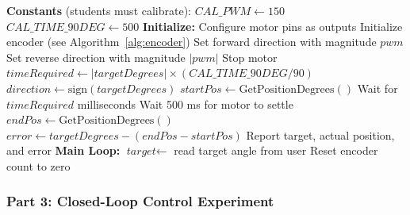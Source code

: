 \begin{algorithm}
\caption{Open-Loop Position Control (Timed Pulses)}
\label{alg:openloop}
\begin{algorithmic}[1]
\State \textbf{Constants} (students must calibrate):
\State \hspace{1em} $\textit{CAL\_PWM} \gets 150$ 
\State \hspace{1em} $\textit{CAL\_TIME\_90DEG} \gets 500$ 
\State
\State \textbf{Initialize:}
\State \hspace{1em} Configure motor pins as outputs
\State \hspace{1em} Initialize encoder (see Algorithm~\ref{alg:encoder})
\State
{}
        \State Set forward direction with magnitude $\textit{pwm}$
        \State Set reverse direction with magnitude $|\textit{pwm}|$
    \Else
        \State Stop motor
    \EndIf
\EndProcedure
\State
{}
    \State $\textit{timeRequired} \gets |\textit{targetDegrees}| \times (\textit{CAL\_TIME\_90DEG} / 90)$
    \State $\textit{direction} \gets \text{sign}(\textit{targetDegrees})$
    \State $\textit{startPos} \gets \text{GetPositionDegrees}()$
    \State {}
    \State Wait for $\textit{timeRequired}$ milliseconds
    \State {}
    \State Wait 500 ms for motor to settle
    \State $\textit{endPos} \gets \text{GetPositionDegrees}()$
    \State $\textit{error} \gets \textit{targetDegrees} - (\textit{endPos} - \textit{startPos})$
    \State Report target, actual position, and error
\EndProcedure
\State
\State \textbf{Main Loop:}
        \State $\textit{target} \gets$ read target angle from user
        \State Reset encoder count to zero
        \State {}
    \EndIf
\EndWhile
\end{algorithmic}
\end{algorithm}

\subsubsection{Part 3: Closed-Loop Control Experiment}

